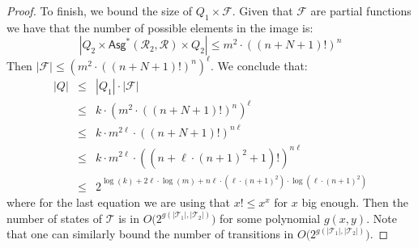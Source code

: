 \documentclass[
a4paper
]{article}
\theoremstyle{plain}
\theoremstyle{definition}
\theoremstyle{remark}
\newcommand{\Reg}{\mathcal{R}}
\newcommand{\Asgs}{\operatorname{Asg}^*}
\newcommand{\nsst}{\mathcal{T}}
\renewcommand{\operatorname}[1]{\textsf{#1}}
\begin{document}
\begin{proof}
To finish, we bound the size of $Q_1 \times \mathcal{F}$. Given that $\mathcal{F}$ are partial functions we have that the number of possible elements in the image is:
\[
|Q_2 \times \Asgs(\Reg_2, \Reg) \times Q_2| \leq m^2 \cdot ((n+N+1)!)^n
\]
Then $|\mathcal{F}| \leq (m^2 \cdot ((n+N+1)!)^n)^\ell$. We conclude that:
\[
\begin{array}{rcl}
	|Q| & \leq & |Q_1| \cdot |\mathcal{F}| \\
	& \leq & k \cdot (m^2 \cdot ((n+N+1)!)^n)^\ell \\
	& \leq & k \cdot m^{2\ell} \cdot ((n+N+1)!)^{n\ell} \\
	& \leq & k \cdot m^{2\ell} \cdot ((n+\ell \cdot (n+1)^2+1)!)^{n\ell} \\
	& \leq & 2^{\log(k)+2\ell\cdot \log(m)+n \ell \cdot (\ell \cdot (n+1)^2) \cdot \log(\ell \cdot (n+1)^2)}
\end{array}
\]
where for the last equation we are using that $x! \leq x^x$ for $x$ big enough. Then the number of states of $\nsst$ is in $O\big(2^{g(|\nsst_1|, |\nsst_2|)}\big)$ for some polynomial $g(x, y)$. Note that one can similarly bound the number of transitions in $O\big(2^{g(|\nsst_1|, |\nsst_2|)}\big)$.
\end{proof} 	
\end{document}
